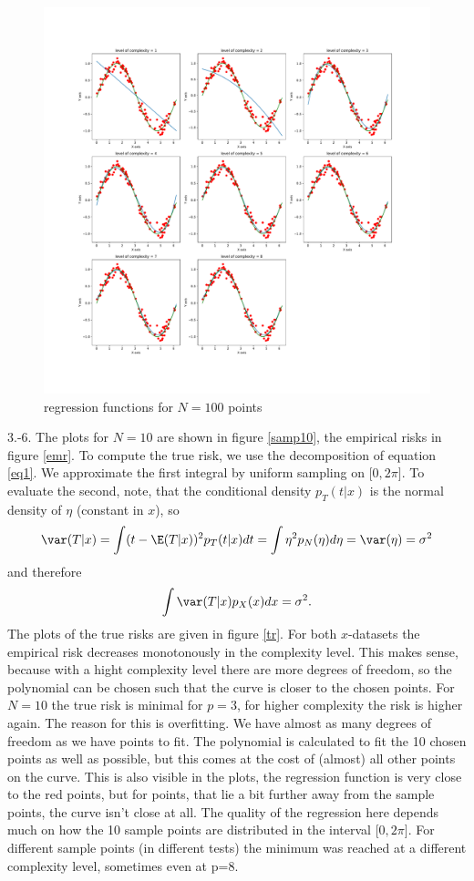\documentclass[english]{exercisesheet}
\begin{document}
\begin{solution}
\begin{figure}
  \includegraphics[width=\textwidth]{images/samples-100.pdf}
  \caption{regression functions for $N=100$ points}
  \label{samp100}
 \end{figure}
\par3.-6. The plots for $N=10$ are shown in figure \ref{samp10}, the empirical risks in figure \ref{emr}. To compute the true risk, we use the decomposition of equation \ref{eq1}. We approximate the first integral by uniform sampling on $\lbrack 0, 2\pi\rbrack$. To evaluate the second, note, that the conditional density $p_T(t|x)$ is the normal density of $\eta$ (constant in $x$), so
\begin{equation*}
 \var(T|x)=\int (t-\E(T|x))^2 p_T(t|x)dt=\int \eta^2 p_N(\eta) d\eta=\var(\eta)=\sigma^2
\end{equation*}
and therefore
\begin{equation*}
 \int \var(T|x) p_X(x)dx=\sigma^2.
\end{equation*}
The plots of the true risks are given in figure \ref{tr}. For both $x$-datasets the empirical risk decreases monotonously in the complexity level. This makes sense, because with a hight complexity level there are more degrees of freedom, so the polynomial can be chosen such that the curve is closer to the chosen points. For $N=10$ the true risk is minimal for $p=3$, for higher complexity the risk is higher again. The reason for this is overfitting. We have almost as many degrees of freedom as we have points to fit. The polynomial is calculated to fit the 10 chosen points as well as possible, but this comes at the cost of (almost) all other points on the curve. This is also visible in the plots, the regression function is very close to the red points, but for points, that lie a bit further away from the sample points, the curve isn't close at all. The quality of the regression here depends much on how the 10 sample points are distributed in the interval $\lbrack0,2\pi\rbrack$. For different sample points (in different tests) the minimum was reached at a different complexity level, sometimes even at p=8.\\

\end{solution}
\end{document}
